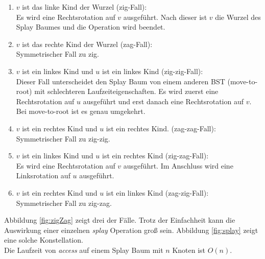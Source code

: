 \documentclass[a4paper,12pt]{article}
\begin{document}
\begin{enumerate}
	\item $v$ ist das linke Kind der Wurzel (zig-Fall):\\
	Es wird eine Rechtsrotation auf $v$ ausgeführt. Nach dieser ist $v$ die Wurzel des Splay Baumes und die Operation wird beendet. 
	\item $v$ ist das rechte Kind der Wurzel (zag-Fall):\\
	Symmetrischer Fall zu zig.
	\item $v$ ist ein linkes Kind und $u$ ist ein linkes Kind (zig-zig-Fall):\\
	Dieser Fall unterscheidet den Splay Baum von einem anderen BST (move-to-root) mit schlechteren Laufzeiteigenschaften. Es wird zuerst eine Rechtsrotation auf $u$ ausgeführt und erst danach eine Rechtsrotation auf $v$. Bei move-to-root  ist es genau umgekehrt. 
	\item $v$ ist ein rechtes Kind und $u$ ist ein rechtes Kind. (zag-zag-Fall):\\
	Symmetrischer Fall zu zig-zig.
	\item $v$ ist ein linkes Kind und $u$ ist ein rechtes Kind (zig-zag-Fall):\\
	Es wird eine Rechtsrotation auf $v$ ausgeführt. Im Anschluss wird eine Linksrotation auf $u$ ausgeführt.
	\item $v$ ist ein rechtes Kind und $u$ ist ein linkes Kind (zag-zig-Fall):\\
	Symmetrischer Fall zu zig-zag.
	
\end{enumerate}
Abbildung  \ref{fig:zigZag} zeigt drei der Fälle. Trotz der Einfachheit kann die Auswirkung einer einzelnen \textit{splay} Operation groß sein. Abbildung \ref{fig:splay} \cite{splay} zeigt eine solche Konstellation. \\
Die Laufzeit von \textit{access} auf einem Splay Baum mit $n$ Knoten ist $O\left(n\right)$.
\end{document}
